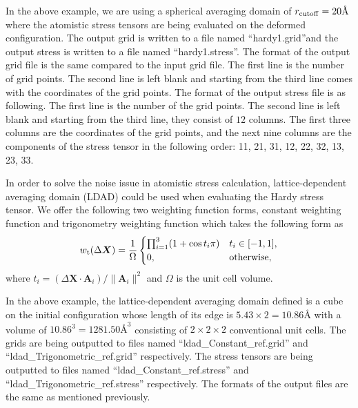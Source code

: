 \documentclass[authoryear]{elsarticle}
\begin{document}
In the above example, we are using a spherical averaging domain of $r_{\rm{cutoff}} = 20 \text{\AA}$ where the atomistic stress tensors are being evaluated on the deformed configuration.
The output grid is written to a file named ``hardy1.grid''and the output stress is written to a file named ``hardy1.stress''.
The format of the output grid file is the same compared to the input grid file.
The first line is the number of grid points. The second line is left blank and starting from the third line comes with the coordinates of the grid points.
The format of the output stress file is as following.
The first line is the number of the grid points. The second line is left blank and starting from the third line, they
consist of $12$ columns. The first three columns are the coordinates of
the grid points, and the next nine columns are the components of
the stress tensor in the following order:
11, 21, 31, 12, 22, 32, 13, 23, 33.


In order to solve the noise issue in atomistic stress calculation, lattice-dependent averaging domain (LDAD) could be used when evaluating the Hardy stress tensor.
We offer the following two weighting function forms, constant weighting function and trigonometry weighting function which takes the following form as
\begin{align}
 w_{\rm t}(\Delta\bm X) &= \frac{1}{\Omega}
\begin{cases}
    \prod_{i=1}^3 (1+\cos t_i\pi) & t_i\in[-1,1], \\
    0, & \text{otherwise}, \\
\end{cases} \label{eqn:cosine_w} \\
\end{align}
where $t_i=(\Delta\bm X \cdot \bm A_i)/\|\bm A_i\|^2$ and $\Omega$ is the unit cell volume.

In the above example, the lattice-dependent averaging domain defined is a cube on the initial configuration whose length of its edge is $5.43 \times 2 = 10.86\text{\AA}$ with a volume of $10.86 ^ 3 = 1281.50 \text{\AA}^3$ consisting of $2 \times 2 \times 2$ conventional unit cells.
The grids are being outputted to files named ``ldad\_Constant\_ref.grid'' and ``ldad\_Trigonometric\_ref.grid'' respectively.
The stress tensors are being outputted to files named ``ldad\_Constant\_ref.stress'' and ``ldad\_Trigonometric\_ref.stress'' respectively.
The formats of the output files are the same as mentioned previously.
\end{document}
